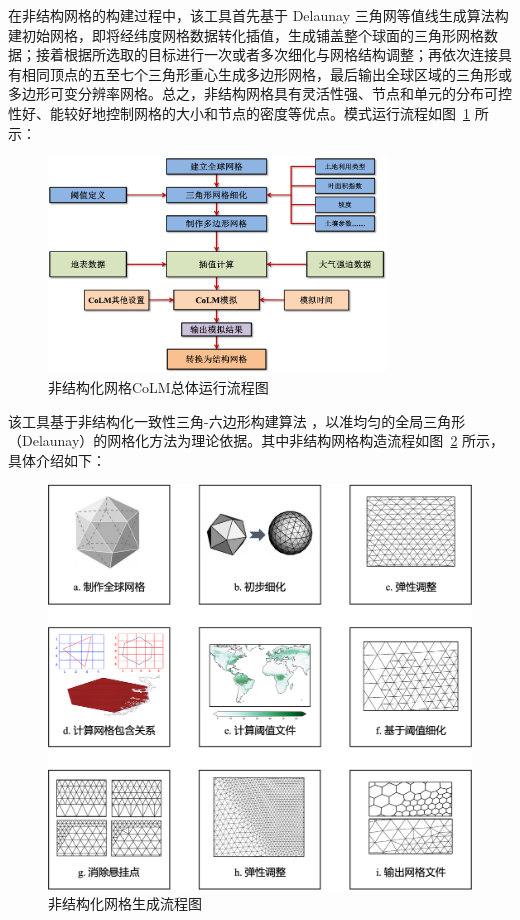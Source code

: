 在非结构网格的构建过程中，该工具首先基于 Delaunay 三角网等值线生成算法构建初始网格，即将经纬度网格数据转化插值，生成铺盖整个球面的三角形网格数据；接着根据所选取的目标进行一次或者多次细化与网格结构调整；再依次连接具有相同顶点的五至七个三角形重心生成多边形网格，最后输出全球区域的三角形或多边形可变分辨率网格。总之，非结构网格具有灵活性强、节点和单元的分布可控性好、能较好地控制网格的大小和节点的密度等优点。模式运行流程如图~\ref{fig:非结构化网格CoLM总体运行流程图} 所示：
 {
\begin{figure}[htbp]
\centering
\includegraphics[width=0.8\textwidth]{Figures/模式构架/非结构化网格CoLM总体运行流程图.png}
\caption{非结构化网格CoLM总体运行流程图}
\label{fig:非结构化网格CoLM总体运行流程图}
\end{figure}
}

该工具基于非结构化一致性三角-六边形构建算法 \citep{fatichi2020soil,walko2008ocean,walko_direct_2011}，以准均匀的全局三角形（Delaunay）的网格化方法为理论依据。其中非结构网格构造流程如图~\ref{fig:非结构化网格生成流程图} 所示，具体介绍如下：
{
\begin{figure}[htbp]
\centering
\includegraphics[width=\textwidth]{Figures/模式构架/非结构化网格生成流程图.png}
\caption{非结构化网格生成流程图}
\label{fig:非结构化网格生成流程图}
\end{figure}
}

